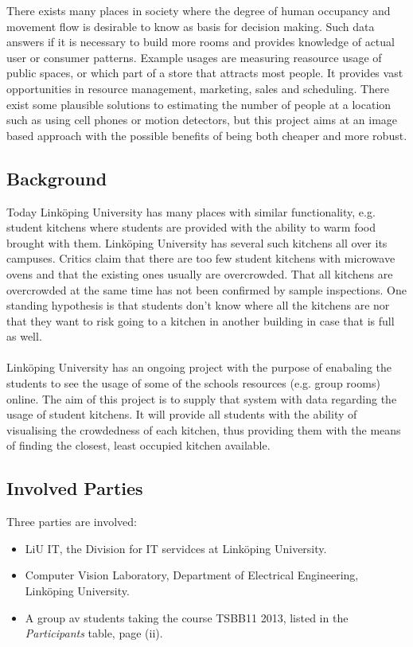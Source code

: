There exists many places in society where the degree of human occupancy and movement flow is desirable to know as basis for decision making. Such data answers if it is necessary to build more rooms and provides knowledge of actual user or consumer patterns. Example usages are measuring reasource usage of public spaces, or which part of a store that attracts most people. It provides vast opportunities in resource management, marketing, sales and scheduling. There exist some plausible solutions to estimating the number of people at a location such as using cell phones or motion detectors, but this project aims at an image based approach with the possible benefits of being both cheaper and more robust.

\subsection{Background}
Today Linköping University has many places with similar functionality, e.g. student kitchens where students are provided with the ability to warm food brought with them. Linköping University has several such kitchens all over its campuses. Critics claim that there are too few student kitchens with microwave ovens and that the existing ones usually are overcrowded. That all kitchens are overcrowded at the same time has not been confirmed by sample inspections. One standing hypothesis is that students don't know where all the kitchens are nor that they want to risk going to a kitchen in another building in case that is full as well.\\
\\
Linköping University has an ongoing project with the purpose of enabaling the students to see the usage of some of the schools resources (e.g. group rooms) online. The aim of this project is to supply that system with data regarding the usage of student kitchens. It will provide all students with the ability of visualising the crowdedness of each kitchen, thus providing them with the means of finding the closest, least occupied kitchen available.

\subsection{Involved Parties}
Three parties are involved:
\begin{itemize}
\item LiU IT, the Division for IT servidces at Linköping University.
\item Computer Vision Laboratory, Department of Electrical Engineering, Linköping University.
\item A group av students taking the course TSBB11 2013, listed in the \textit{Participants} table, page (ii).
\end{itemize}

